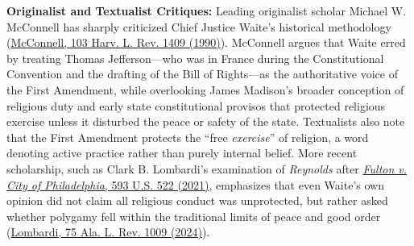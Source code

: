 \documentclass[12pt]{article}
\begin{document}
\textbf{Originalist and Textualist Critiques:} Leading originalist scholar Michael W. McConnell has sharply criticized Chief Justice Waite's historical methodology (\href{https://law.yale.edu/sites/default/files/area/clinic/document/michael_mcconnell_the_origins_and_historical_understanding_of_free_exercise_of_religion_103_harv._l._rev._1409_1989.pdf}{McConnell, 103 Harv. L. Rev. 1409 (1990)}). McConnell argues that Waite erred by treating Thomas Jefferson---who was in France during the Constitutional Convention and the drafting of the Bill of Rights---as the authoritative voice of the First Amendment, while overlooking James Madison's broader conception of religious duty and early state constitutional provisos that protected religious exercise unless it disturbed the peace or safety of the state. Textualists also note that the First Amendment protects the ``free \textit{exercise}'' of religion, a word denoting active practice rather than purely internal belief. More recent scholarship, such as Clark B. Lombardi's examination of \textit{Reynolds} after \href{https://www.law.cornell.edu/supremecourt/text/19-123}{\textit{Fulton v. City of Philadelphia}, 593 U.S. 522 (2021)}, emphasizes that even Waite's own opinion did not claim all religious conduct was unprotected, but rather asked whether polygamy fell within the traditional limits of peace and good order (\href{https://law.ua.edu/wp-content/uploads/2024/06/Lombardi.pdf}{Lombardi, 75 Ala. L. Rev. 1009 (2024)}).
\end{document}
